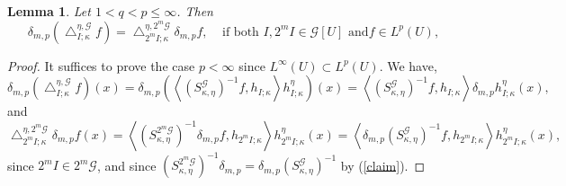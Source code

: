 \documentclass[10pt,a4paper]{amsart}
\newtheorem{lemma}{Lemma}
\begin{document}
\begin{lemma}
\label{proj inv}Let $1<q<p\leq\infty$. Then%
\begin{equation}
\delta_{m,p}\left(  \bigtriangleup_{I;\kappa}^{\eta,\mathcal{G}}f\right)
=\bigtriangleup_{2^{m}I;\kappa}^{\eta,2^{m}\mathcal{G}}\delta_{m,p}%
f,\ \ \ \ \ \text{if both }I,2^{m}I\in\mathcal{G}\left[  U\right]  \text{ and
}f\in L^{p}\left(  U\right)  ,\label{inv}%
\end{equation}

\end{lemma}

\begin{proof}
It suffices to prove the case $p<\infty$ since $L^{\infty}\left(  U\right)
\subset L^{p}\left(  U\right)  $. We have,%
\begin{equation}
\delta_{m,p}\left(  \bigtriangleup_{I;\kappa}^{\eta,\mathcal{G}}f\right)
\left(  x\right)  =\delta_{m,p}\left(  \left\langle \left(  S_{\kappa,\eta
}^{\mathcal{G}}\right)  ^{-1}f,h_{I;\kappa}\right\rangle h_{I;\kappa}^{\eta
}\right)  \left(  x\right)  =\left\langle \left(  S_{\kappa,\eta}%
^{\mathcal{G}}\right)  ^{-1}f,h_{I;\kappa}\right\rangle \delta_{m,p}%
h_{I;\kappa}^{\eta}\left(  x\right)  ,\label{one}%
\end{equation}
and%
\begin{equation}
\bigtriangleup_{2^{m}I;\kappa}^{\eta,2^{m}\mathcal{G}}\delta_{m,p}f\left(
x\right)  =\left\langle \left(  S_{\kappa,\eta}^{2^{m}\mathcal{G}}\right)
^{-1}\delta_{m,p}f,h_{2^{m}I;\kappa}\right\rangle h_{2^{m}I;\kappa}^{\eta
}\left(  x\right)  =\left\langle \delta_{m,p}\left(  S_{\kappa,\eta
}^{\mathcal{G}}\right)  ^{-1}f,h_{2^{m}I;\kappa}\right\rangle h_{2^{m}%
I;\kappa}^{\eta}\left(  x\right)  ,\label{two}%
\end{equation}
since $2^{m}I\in2^{m}\mathcal{G}$, and since $\left(  S_{\kappa,\eta}%
^{2^{m}\mathcal{G}}\right)  ^{-1}\delta_{m,p}=\delta_{m,p}\left(
S_{\kappa,\eta}^{\mathcal{G}}\right)  ^{-1}$ by (\ref{claim}).


\end{proof}
\end{document}
